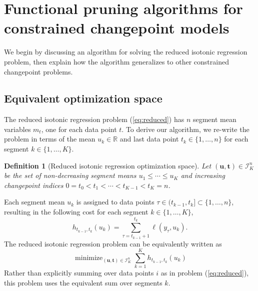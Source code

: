 \documentclass{article}
\newtheorem{definition}{Definition}
\DeclareMathOperator*{\minimize}{minimize}
\newcommand{\RR}{\mathbb R}
\begin{document}
\newcommand{\FCC}{C}
\newcommand{\M}{\mathcal{M}}
\section{Functional 
pruning algorithms for constrained
  changepoint models}
\label{sec:algorithms}



We begin by discussing an algorithm for solving the reduced isotonic
regression problem, then explain how the algorithm
generalizes to other constrained changepoint problems.

\subsection{Equivalent optimization space}

The reduced isotonic regression problem (\ref{eq:reduced}) has $n$
segment mean variables $m_t$, one for each data point $t$. To derive
our algorithm, we re-write the problem in terms of the mean
$ u_k\in\RR$ and last data point $t_k\in\{1,\dots,n\}$ for each
segment $k\in\{1,\dots, K\}$.
\begin{definition}[Reduced isotonic regression optimization space]
\label{def:Ibar}
  Let $(\mathbf u, \mathbf t)\in{\mathcal I}^n_K$ be the set of
  non-decreasing segment means $u_1\leq\cdots\leq u_K$ and
  increasing changepoint indices $0=t_0<t_1<\cdots<t_{K-1}<t_K=n$.
\end{definition}
Each segment mean $u_k$ is assigned to data points
$\tau\in(t_{k-1},t_k]\subset\{1,\dots,n\}$, resulting in the following
cost for each segment $k\in\{1, \dots, K\}$, 
\begin{equation}
  \label{eq:h}
  h_{t_{k-1}, t_k}(u_k) = \sum_{\tau=t_{k-1}+1}^{t_k} \ell(y_\tau, u_k).
\end{equation}
The reduced isotonic regression problem can be equivalently written as
\begin{equation}
  \label{eq:isotonic_ut}
  \minimize_{(\mathbf u, \mathbf t)\in{\mathcal I}^n_K}
  \sum_{k=1}^K
  h_{t_{k-1}, t_k}(u_k)
\end{equation}
Rather than explicitly summing over data points $i$ as in problem
(\ref{eq:reduced}), this problem uses the equivalent sum over segments $k$. 
\end{document}
